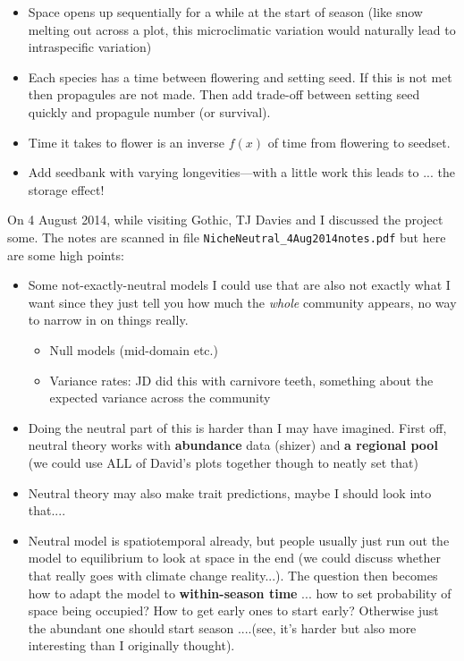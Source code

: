 \documentclass[11pt,a4paper]{article}
\begin{document}
\begin{itemize}
\item Space opens up sequentially for a while at the start of season (like snow melting out across a plot, this microclimatic variation would naturally lead to intraspecific variation)
\item Each species has a time between flowering and setting seed. If this is not met then propagules are not made. Then add trade-off between setting seed quickly and propagule number (or survival).
\item Time it takes to flower is an inverse $f(x)$ of time from flowering to seedset.
\item Add seedbank with varying longevities---with a little work this leads to ... the storage effect!
\end{itemize}


On 4 August 2014, while visiting Gothic, TJ Davies and I discussed the project some. The notes are scanned in file \verb|NicheNeutral_4Aug2014notes.pdf| but here are some high points:
\begin{itemize}
\item Some not-exactly-neutral models I could use that are also not exactly what I want since they just tell you how much the \emph{whole} community appears, no way to narrow in on things really.
\begin{itemize}
\item Null models (mid-domain etc.)
\item Variance rates: JD did this with carnivore teeth, something about the expected variance across the community
\end{itemize}
\item Doing the neutral part of this is harder than I may have imagined. First off, neutral theory works with {\bf abundance} data (shizer) and {\bf a regional pool} (we could use ALL of David's plots together though to neatly set that)
\item Neutral theory may also make trait predictions, maybe I should look into that....
\item Neutral model is spatiotemporal already, but people usually just run out the model to equilibrium to look at space in the end (we could discuss whether that really goes with climate change reality...). The question then becomes how to adapt the model to {\bf within-season time} ... how to set probability of space being occupied? How to get early ones to start early? Otherwise just the abundant one should start season ....(see, it's harder but also more interesting than I originally thought).
\end{itemize}
\end{document}
